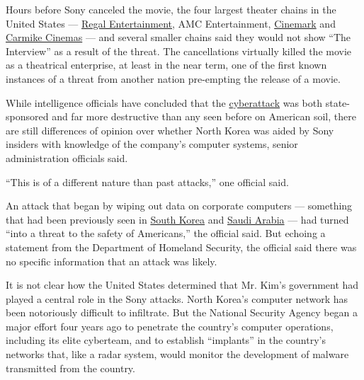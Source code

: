 Hours before Sony canceled the movie, the four largest theater chains in
the United States ---
\href{http://topics.nytimes.com/top/news/business/companies/regal-entertainment-group/index.html?module=Search\&mabReward=relbias\%3Aw\%2C\%7B\%221\%22\%3A\%22RI\%3A8\%22\%7D}{Regal
Entertainment}, AMC Entertainment,
\href{http://topics.nytimes.com/top/news/business/companies/cinemark-holdings-inc/index.html}{Cinemark}
and
\href{http://topics.nytimes.com/top/news/business/companies/carmike-cinemas-inc/index.html}{Carmike
Cinemas} --- and several smaller chains said they would not show ``The
Interview'' as a result of the threat. The cancellations virtually
killed the movie as a theatrical enterprise, at least in the near term,
one of the first known instances of a threat from another nation
pre-empting the release of a movie.

While intelligence officials have concluded that the
\href{http://www.nytimes.com/2014/12/03/business/media/sony-is-again-target-of-hackers.html}{cyberattack}
was both state-sponsored and far more destructive than any seen before
on American soil, there are still differences of opinion over whether
North Korea was aided by Sony insiders with knowledge of the company's
computer systems, senior administration officials said.

``This is of a different nature than past attacks,'' one official said.

An attack that began by wiping out data on corporate computers ---
something that had been previously seen in
\href{http://www.nytimes.com/2013/03/21/world/asia/south-korea-computer-network-crashes.html?pagewanted=all\&module=Search\&mabReward=relbias\%3Ar\%2C\%7B\%221\%22\%3A\%22RI\%3A8\%22\%7D}{South
Korea} and
\href{http://www.nytimes.com/2012/10/14/world/middleeast/us-suspects-iranians-were-behind-a-wave-of-cyberattacks.html?pagewanted=all\&module=Search\&mabReward=relbias\%3Ar\%2C\%7B\%221\%22\%3A\%22RI\%3A8\%22\%7D}{Saudi
Arabia} --- had turned ``into a threat to the safety of Americans,'' the
official said. But echoing a statement from the Department of Homeland
Security, the official said there was no specific information that an
attack was likely.

It is not clear how the United States determined that Mr. Kim's
government had played a central role in the Sony attacks. North Korea's
computer network has been notoriously difficult to infiltrate. But the
National Security Agency began a major effort four years ago to
penetrate the country's computer operations, including its elite
cyberteam, and to establish ``implants'' in the country's networks that,
like a radar system, would monitor the development of malware
transmitted from the country.

